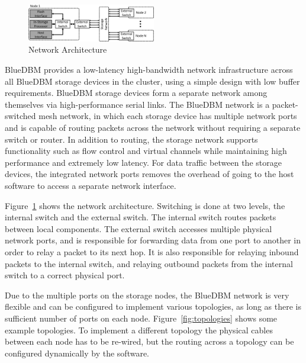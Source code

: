 \begin{figure}[b]
	\begin{center}
	\includegraphics[width=0.5\textwidth]{figures/network-architecture-crop.pdf}
	\caption{Network Architecture}
	\label{fig:networkinterface}
	\end{center}
\end{figure}


BlueDBM provides a low-latency high-bandwidth network infrastructure across
all BlueDBM storage devices in the cluster, using a simple design with low buffer requirements. BlueDBM storage devices form a separate network
among themselves via high-performance serial links.  The BlueDBM network is a
packet-switched mesh network, in which each storage device has multiple network
ports and is capable of routing packets across the network without requiring a
separate switch or router.  In addition to routing, the storage network supports functionality such as
flow control and virtual channels while maintaining high performance and
extremely low latency.  For data traffic between the storage devices, the
integrated network ports removes the overhead of going to the host software to
access a separate network interface.

Figure~\ref{fig:networkinterface} shows the network architecture. Switching is
done at two levels, the internal switch and the external switch.  The internal
switch routes packets between local components.  The external switch accesses
multiple physical network ports, and is responsible for forwarding data from one
port to another in order to relay a packet to its next hop. It is also
responsible for relaying inbound packets to the internal
switch, and relaying outbound packets from the internal switch to a correct
physical port. 

Due to the multiple ports on the storage nodes, the BlueDBM network is very
flexible and can be configured to implement various topologies, as long as there
is sufficient number of ports on each node.
Figure~\ref{fig:topologies} shows some example topologies. To implement a
different topology the physical cables between each node has to be re-wired, but
the routing across a topology can be configured dynamically by the software.


